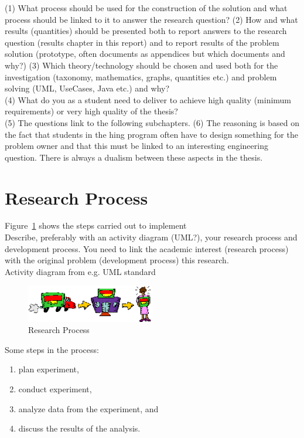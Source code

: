 {(1) What process should be used for the construction of the solution and what process should be linked to it to answer the research question?
(2) How and what results (quantities) should be presented both to report answers to the research question (results chapter in this report) and to report results of the problem solution (prototype, often documents as appendices but which documents and why?)
(3) Which theory/technology should be chosen and used both for the investigation (taxonomy, mathematics, graphs, quantities etc.) and problem solving (UML, UseCases, Java etc.) and why?\\
(4) What do you as a student need to deliver to achieve high quality (minimum requirements) or very high quality of the thesis?\\
(5) The questions link to the following subchapters.
(6) The reasoning is based on the fact that students in the hing program often have to design something for the problem owner and that this must be linked to an interesting engineering question. There is always a dualism between these aspects in the thesis.
}

\section{Research Process}
\label{sec:researchProcess}

Figure~\ref{fig:researchprocess} shows the steps carried out to implement\\
Describe, preferably with an activity diagram (UML?), your research process and development process.  You need to link the academic interest (research process) with the original problem (development process)
this research.\\
Activity diagram from e.g. UML standard


 
\begin{figure}[!ht]
  \begin{center}
    \includegraphics[width=0.5\textwidth]{figures/researchprocess.png}
  \end{center}
  \caption{Research Process}
  \label{fig:researchprocess}
\end{figure}

Some steps in the process:
\begin{enumerate}[leftmargin=*, label=\textbf{Step \arabic*}, ref=Step \arabic*] %
    \itemsep0em
    \item \label{x:s1} plan experiment,
    \item \label{x:s2} conduct experiment,
    \item \label{x:s3} analyze data from the experiment, and
    \item \label{x:s4} discuss the results of the analysis.
\end{enumerate}


